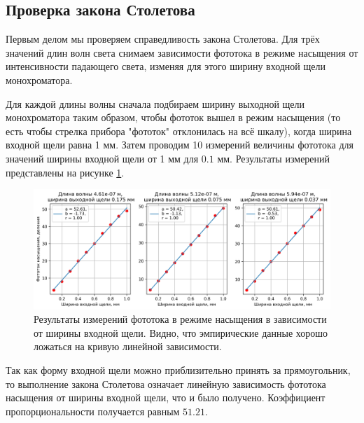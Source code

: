 \documentclass[12pt]{article}
\begin{document}
	\subsection{Проверка закона Столетова}
	Первым делом мы проверяем справедливость закона Столетова. Для трёх значений длин волн света снимаем зависимости фототока в режиме насыщения от интенсивности падающего света, изменяя для этого ширину входной щели монохроматора. 
	\par Для каждой длины волны сначала подбираем ширину выходной щели монохроматора таким образом, чтобы фототок вышел в режим насыщения (то есть чтобы стрелка прибора "{}фототок"{} отклонилась на всё шкалу), когда ширина входной щели равна 1 мм. Затем проводим 10 измерений величины фототока для значений ширины входной щели от 1 мм для $0.1$ мм. Результаты измерений представлены на рисунке \ref{fig:2}.
	\begin{figure}[htbp]
		\centering
		\includegraphics[width=1\linewidth]{../plots/1.png}
		\caption{Результаты измерений фототока в режиме насыщения в зависимости от ширины входной щели. Видно, что эмпирические данные хорошо ложаться на кривую линейной зависимости.}
		\label{fig:2}
	\end{figure}
	Так как форму входной щели можно приблизительно принять за прямоугольник, то выполнение закона Столетова означает линейную зависимость фототока насыщения от ширины входной щели, что и было получено. Коэффициент пропорциональности получается равным $51.21$.
\end{document}
